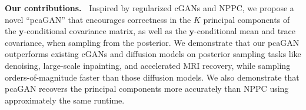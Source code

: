 \documentclass{article}
\theoremstyle{plain}
\theoremstyle{definition}
\theoremstyle{remark}
\renewcommand{\vec}[1]{\ensuremath{\boldsymbol{#1}}}
\begin{document}
\textbf{Our contributions.~} 
Inspired by regularized cGANs and NPPC, we propose a novel ``pcaGAN'' that encourages correctness in the $K$ principal components of the $\vec{y}$-conditional covariance matrix, as well as the $\vec{y}$-conditional mean and trace covariance, when sampling from the posterior.
We demonstrate that our pcaGAN outperforms existing cGANs \cite{Adler:18, Zhao:ICLR:21, Bendel:NIPS:23, Ohayon:ICCVW:21} and diffusion models \cite{Jalal:NIPS:21,Chung:ICLR:23, Kawar:NIPS:22, Wang:ICLR:23} on posterior sampling tasks like denoising, large-scale inpainting, and accelerated MRI recovery, while sampling orders-of-magnitude faster than those diffusion models.
We also demonstrate that pcaGAN recovers the principal components more accurately than NPPC using approximately the same runtime.


\end{document}
